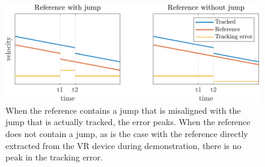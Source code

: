 \documentclass[11pt]{report}
\numberwithin{equation}{section}        %
\numberwithin{figure}{section}          %
\numberwithin{table}{section}           %
\begin{document}
    \begin{figure}[]
  \centering
  \begin{adjustwidth}{0pt}{5pt}
  \includegraphics[right]{Graphics/RSvive.pdf}
  \end{adjustwidth}
  \caption{When the reference contains a jump that is misaligned with the jump that is actually tracked, the error peaks. When the reference does not contain a jump, as is the case with the reference directly extracted from the VR device during demonstration, there is no peak in the tracking error.}
  \label{fig:RSvive}
  \end{figure}
\end{document}
